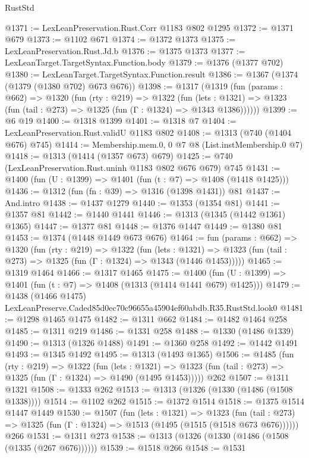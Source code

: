 \begin{lexlean}{RustStd}
\begin{coremodule}
@1371 := LexLeanPreservation.Rust.Corr @1183 @802 @1295
@1372 := @1371 @679
@1373 := @1102 @671
@1374 := @1372 @1373
@1375 := LexLeanPreservation.Rust.Jd.b
@1376 := @1375 @1373
@1377 := LexLeanTarget.TargetSyntax.Function.body
@1379 := @1376 (@1377 @702)
@1380 := LexLeanTarget.TargetSyntax.Function.result
@1386 := @1367 (@1374 (@1379 (@1380 @702) @673 @676))
@1398 := @1317
    (@1319
      (fun (params : @662) =>
      @1320
        (fun (rty : @219) =>
        @1322
          (fun (lets : @1321) =>
          @1323 (fun (tail : @273) => @1325 (fun (Γ : @1324) => @1343 @1386))))))
@1399 := @6 @19
@1400 := @1318 @1399
@1401 := @1318 @7
@1404 := LexLeanPreservation.Rust.validU @1183 @802
@1408 := @1313 (@740 (@1404 @676) @745)
@1414 := Membership.mem.{0, 0} @7 @8 (List.instMembership.{0} @7)
@1418 := @1313 (@1414 (@1357 @673) @679)
@1425 := @740 (LexLeanPreservation.Rust.uninh @1183 @802 @676 @679) @745
@1431 := @1400 (fun (U : @1399) => @1401 (fun (t : @7) => @1408 (@1418 @1425)))
@1436 := @1312 (fun (fn : @39) => @1316 (@1398 @1431)) @81
@1437 := And.intro
@1438 := @1437 @1279
@1440 := @1353 (@1354 @81)
@1441 := @1357 @81
@1442 := @1440 @1441
@1446 := @1313 (@1345 (@1442 @1361) @1365)
@1447 := @1377 @81
@1448 := @1376 @1447
@1449 := @1380 @81
@1453 := @1374 (@1448 @1449 @673 @676)
@1464 := fun (params : @662) =>
  @1320
    (fun (rty : @219) =>
    @1322
      (fun (lets : @1321) =>
      @1323 (fun (tail : @273) => @1325 (fun (Γ : @1324) => @1343 (@1446 @1453)))))
@1465 := @1319 @1464
@1466 := @1317 @1465
@1475 := @1400 (fun (U : @1399) => @1401 (fun (t : @7) => @1408 (@1313 (@1414 @1441 @679) @1425)))
@1479 := @1438 (@1466 @1475) LexLeanPreserve.Caded85d0ec70c96655a45904ef60abdb.R35.RustStd.look0
@1481 := @1298 @1465 @1475
@1482 := @1311 @662
@1484 := @1482 @1464 @258
@1485 := @1311 @219
@1486 := @1331 @258
@1488 := @1330 (@1486 @1339)
@1490 := @1313 (@1326 @1488)
@1491 := @1360 @258
@1492 := @1442 @1491
@1493 := @1345 @1492
@1495 := @1313 (@1493 @1365)
@1506 := @1485
    (fun (rty : @219) =>
    @1322
      (fun (lets : @1321) =>
      @1323 (fun (tail : @273) => @1325 (fun (Γ : @1324) => @1490 (@1495 @1453)))))
    @262
@1507 := @1311 @1321
@1508 := @1333 @262
@1513 := @1313 (@1326 (@1330 (@1486 (@1508 @1338))))
@1514 := @1102 @262
@1515 := @1372 @1514
@1518 := @1375 @1514 @1447 @1449
@1530 := @1507
    (fun (lets : @1321) =>
    @1323 (fun (tail : @273) => @1325 (fun (Γ : @1324) => @1513 (@1495 (@1515 (@1518 @673 @676))))))
    @266
@1531 := @1311 @273
@1538 := @1313 (@1326 (@1330 (@1486 (@1508 (@1335 (@267 @676))))))
@1539 := @1518 @266
@1548 := @1531

\end{coremodule}
\end{lexlean}
